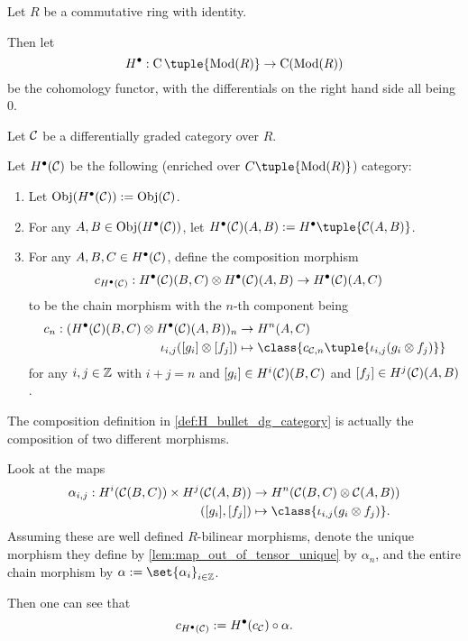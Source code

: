 \begin{notation}
    Let \( R \) be a commutative ring with identity.

    Then let
    \[
        H^\bullet: \C\tuple{\Mod(R)} \to \C(\Mod(R))
    \]
    be the cohomology functor, with the differentials on the right hand side all being \( 0 \).
\end{notation}

\begin{definition}
    \label{def:H_bullet_dg_category}
    Let \( {\mathcal{C}} \) be a differentially graded category over  \( R \).

    Let \( H^\bullet({\mathcal{C}}) \) be the following (enriched over \( C\tuple{\Mod(R)} \)) category:
    \begin{enumerate}
        \item Let \( \operatorname{Obj}(H^\bullet({\mathcal{C}})) := \operatorname{Obj}({\mathcal{C}}) \).
        \item For any \( A, B \in \operatorname{Obj}(H^\bullet({\mathcal{C}})) \), let \( H^\bullet(\Cc)(A, B) := H^\bullet \tuple{\Cc(A, B)} \).
        \item {
            For any \( A, B, C \in H^\bullet({\mathcal{C}}) \), define the composition morphism
            \begin{align*}
                c_{H^\bullet({\mathcal{C}})}: H^\bullet({\mathcal{C}})(B, C) \otimes H^\bullet({\mathcal{C}})(A, B) &\to H^\bullet({\mathcal{C}})(A, C)
            \end{align*}
            to be the chain morphism with the \( n \)-th component being
            \begin{align*}
                c_n: (H^\bullet(\Cc)(B, C) \otimes H^\bullet(\Cc)(A, B))_n &\to H^n(A, C) \\
                \iota_{i, j}([g_i] \otimes [f_j]) &\mapsto \class{c_{\Cc,n}\tuple{\iota_{i, j}(g_i \otimes f_j)}}
            \end{align*}
            for any \( i, j \in {\mathbb{Z}} \) with \( i + j = n \) and \( [g_i] \in H^i({\mathcal{C}})(B, C) \) and \( [f_j] \in H^j({\mathcal{C}})(A, B) \).
        }
    \end{enumerate}
\end{definition}
\begin{remark}
    \label{rem:H_bullet_composition_alpha}
    The composition definition in \autoref{def:H_bullet_dg_category} is actually the composition of two different morphisms.

    Look at the maps
    \begin{align*}
        \alpha_{i, j}: H^i(\Cc(B, C)) \times H^j(\Cc(A, B)) &\to H^n(\Cc(B, C) \otimes \Cc(A, B)) \\
        ([g_i], [f_j]) &\mapsto \class{\iota_{i, j}(g_i \otimes f_j)}.
    \end{align*}
    Assuming these are well defined \( R \)-bilinear morphisms, denote the unique morphism they define by \autoref{lem:map_out_of_tensor_unique} by \( \alpha_n \), and the entire chain morphism by \( \alpha := \set{\alpha_i}_{i \in \Zb} \).
    
    Then one can see that
    \[
        c_{H^\bullet({\mathcal{C}})} := H^\bullet(c_{{\mathcal{C}}}) \circ \alpha.
    \] 
\end{remark}
